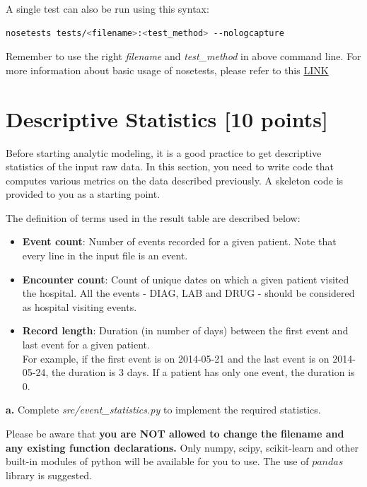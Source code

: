 \documentclass[12pt]{article}
\begin{document}
\noindent A single test can also be run using this syntax: \\    
\begin{lstlisting}[frame=single, language=bash]
nosetests tests/<filename>:<test_method> --nologcapture
\end{lstlisting}
Remember to use the right \textit{filename} and \textit{test\_method} in above command line. For more information about basic usage of nosetests, please refer to this \href{https://nose.readthedocs.io/en/latest/usage.html?highlight=#cmdoption--nologcapture}{LINK}

 \section{Descriptive Statistics [10 points]}
Before starting analytic modeling, it is a good practice to get descriptive statistics of the input raw data. In this section, you need to write code that computes various metrics on the data described previously. A skeleton code is provided to you as a starting point.

The definition of terms used in the result table are described below:
\begin{itemize}
\item \textbf{Event count}: Number of events recorded for a given patient. Note that every line in the input file is an event. 
\item \textbf{Encounter count}: Count of unique dates on which a given patient visited the hospital. All the events - DIAG, LAB and DRUG - should be considered as hospital visiting events.
\item \textbf{Record length}: Duration (in number of days) between the first event and last event for a given patient. \\
For example, if the first event is on 2014-05-21 and the last event is on 2014-05-24, the duration is 3 days. If a patient has only one event, the duration is 0.
\end{itemize}

\textbf{a.} Complete \textit{src/event\_statistics.py} to implement the required statistics.

Please be aware that \textbf{\color{red} you are NOT allowed to change the filename and any existing function declarations.} Only numpy, scipy, scikit-learn and other built-in modules of python will be available for you to use. The use of $pandas$ library is suggested. 
\end{document}
